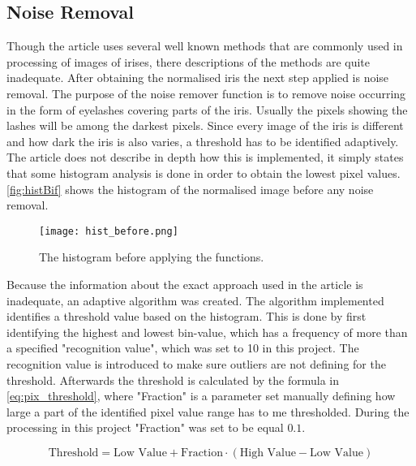 \subsection{Noise Removal}
Though the article uses several well known methods that are commonly used in processing of images of irises, there descriptions of the methods are quite inadequate. After obtaining the normalised iris the next step applied is noise removal. The purpose of the noise remover function is to remove noise occurring in the form of eyelashes covering parts of the iris. Usually the pixels showing the lashes will be among the darkest pixels. Since every image of the iris is different and how dark the iris is also varies, a threshold has to be identified adaptively. The article does not describe in depth how this is implemented, it simply states that some histogram analysis is done in order to obtain the lowest pixel values. \autoref{fig:histBif} shows the histogram of the normalised image before any noise removal. 
\begin{figure}[h]
\centering
\texttt{[image: hist\_before.png]}
\caption{The histogram before applying the functions.}
\label{fig:histBif}
\end{figure}
Because the information about the exact approach used in the article is inadequate, an adaptive algorithm was created. The algorithm implemented identifies a threshold value based on the histogram. This is done by first identifying the highest and lowest bin-value, which has a frequency of more than a specified "recognition value", which was set to 10 in this project. The recognition value is introduced to make sure outliers are not defining for the threshold. Afterwards the threshold is calculated by the formula in \autoref{eq:pix_threshold}, where "Fraction" is a parameter set manually defining how large a part of the identified pixel value range has to me thresholded. During the processing in this project "Fraction" was set to be equal $0.1$. 

\begin{equation}\label{eq:pix_threshold}
	\text{Threshold}=\text{Low~Value}+\text{Fraction}\cdot(\text{High~Value}-\text{Low~Value})
\end{equation}


